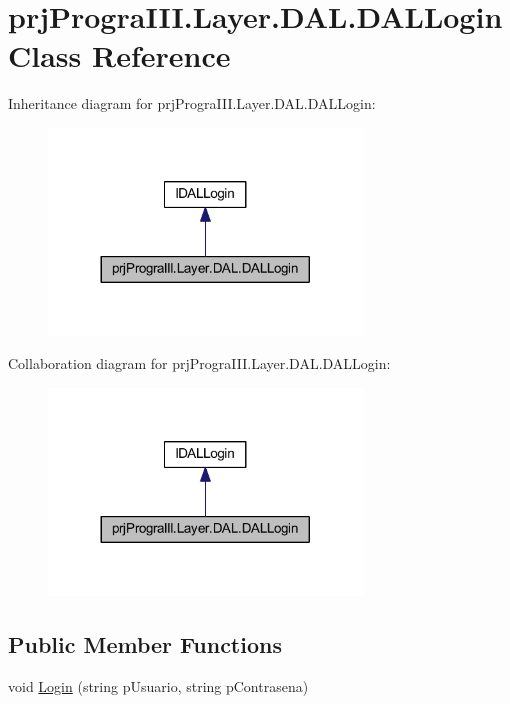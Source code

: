 \hypertarget{classprj_progra_i_i_i_1_1_layer_1_1_d_a_l_1_1_d_a_l_login}{}\section{prj\+Progra\+I\+I\+I.\+Layer.\+D\+A\+L.\+D\+A\+L\+Login Class Reference}
\label{classprj_progra_i_i_i_1_1_layer_1_1_d_a_l_1_1_d_a_l_login}


Inheritance diagram for prj\+Progra\+I\+I\+I.\+Layer.\+D\+A\+L.\+D\+A\+L\+Login\+:
\nopagebreak
\begin{figure}[H]
\begin{center}
\leavevmode
\includegraphics[width=236pt]{classprj_progra_i_i_i_1_1_layer_1_1_d_a_l_1_1_d_a_l_login__inherit__graph}
\end{center}
\end{figure}


Collaboration diagram for prj\+Progra\+I\+I\+I.\+Layer.\+D\+A\+L.\+D\+A\+L\+Login\+:
\nopagebreak
\begin{figure}[H]
\begin{center}
\leavevmode
\includegraphics[width=236pt]{classprj_progra_i_i_i_1_1_layer_1_1_d_a_l_1_1_d_a_l_login__coll__graph}
\end{center}
\end{figure}
\subsection*{Public Member Functions}
\begin{DoxyCompactItemize}
\item 
void \hyperlink{classprj_progra_i_i_i_1_1_layer_1_1_d_a_l_1_1_d_a_l_login_a2c7ffe6eec7104cf55cb7e7b63ba1ce1}{Login} (string p\+Usuario, string p\+Contrasena)
\end{DoxyCompactItemize}


